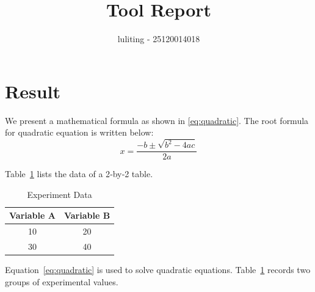 \documentclass{article}
\begin{document}
\title{Tool Report}
\author{luliting - 25120014018}
\maketitle

\section{Result}

We present a mathematical formula as shown in \eqref{eq:quadratic}.
The root formula for quadratic equation is written below:
\begin{equation}
x = \frac{-b \pm \sqrt{b^2-4ac}}{2a}
\label{eq:quadratic}
\end{equation}

Table~\ref{tab:sample} lists the data of a 2‑by‑2 table.
\begin{table}[h]
\centering
\caption{Experiment Data}
\label{tab:sample}
\begin{tabular}{cc}
\toprule
Variable A & Variable B \\
\midrule
10 & 20 \\
30 & 40 \\
\bottomrule
\end{tabular}
\end{table}

Equation~\ref{eq:quadratic} is used to solve quadratic equations.
Table~\ref{tab:sample} records two groups of experimental values.
\end{document}
